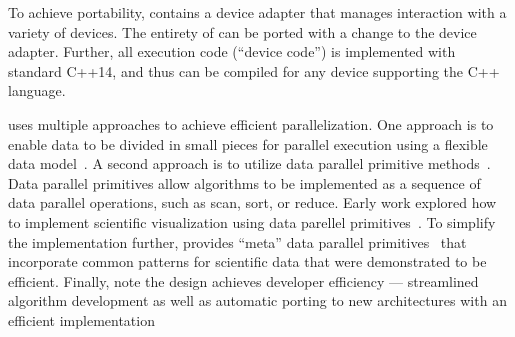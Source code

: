 To achieve portability, \vtkm contains a device adapter that manages interaction with a variety of devices.
The entirety of \vtkm can be ported with a change to the device adapter.
%
Further, all execution code (``device code'') is implemented with standard C++14,
and thus can be compiled for any device supporting the C++ language.

\vtkm uses multiple approaches to achieve efficient parallelization.
One approach is 
to enable data to be divided in small pieces for parallel execution
using a 
flexible data model~\cite{Meredith2012}.
A second approach is 
to utilize
data parallel primitive methods~\cite{Blelloch1990}.
Data parallel primitives allow algorithms to be implemented as a sequence of data parallel operations, such as scan, sort, or reduce.
Early work explored how to implement scientific visualization using data parellel primitives~\cite{Lo2012}.
To simplify the implementation further, \vtkm provides ``meta'' data parallel primitives~\cite{Moreland2021} that incorporate common patterns for scientific data that were demonstrated to be efficient.
Finally, note the \vtkm design achieves developer efficiency --- 
streamlined algorithm development as well as 
automatic
porting to new architectures with an efficient implementation 
